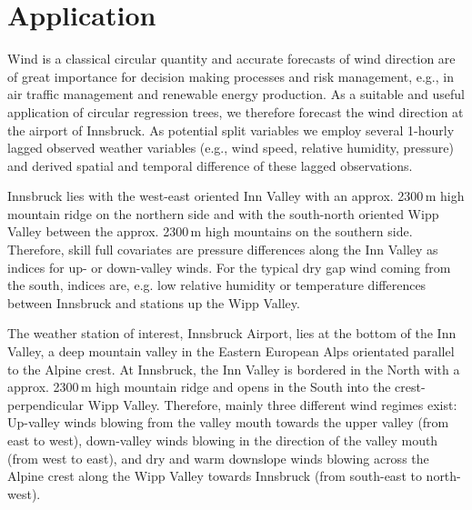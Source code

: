 \documentclass[twoside]{report}
\begin{document}



\section{Application}


Wind is a classical circular quantity and accurate forecasts of wind direction
are of great importance for decision making processes and risk management,
e.g., in air traffic management and renewable energy production. As a suitable
and useful application of circular regression trees, we therefore forecast the
wind direction at the airport of Innsbruck. As potential split variables we
employ several 1-hourly lagged observed weather variables (e.g., wind speed,
relative humidity, pressure) and derived spatial and temporal difference of
these lagged observations.

Innsbruck lies with the west-east oriented Inn Valley with an approx. 2300\,m
high mountain ridge on the northern side and with the south-north oriented Wipp
Valley between the approx. 2300\,m high mountains on the southern side.
Therefore, skill full covariates are pressure differences along the Inn Valley
as indices for up- or down-valley winds. For the typical dry gap wind coming
from the south, indices are, e.g. low relative humidity or temperature
differences between Innsbruck and stations up the Wipp Valley.

The weather station of interest, Innsbruck Airport, lies at the bottom of the
Inn Valley, a deep mountain valley in the Eastern European Alps orientated
parallel to the Alpine crest. At Innsbruck, the Inn Valley is bordered in the
North with a approx. 2300\,m high mountain ridge and opens in the South into
the crest-perpendicular Wipp Valley. Therefore, mainly three different wind
regimes exist: Up-valley winds blowing from the valley mouth towards the upper
valley (from east to west), down-valley winds blowing in the direction of the
valley mouth (from west to east), and dry and warm downslope winds blowing
across the Alpine crest along the Wipp Valley towards Innsbruck (from
south-east to north-west).
\end{document}
